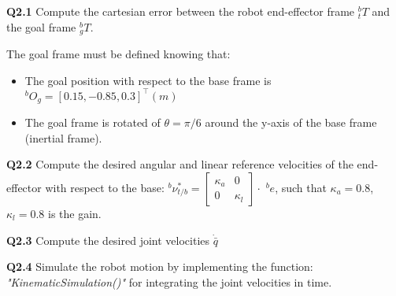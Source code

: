 \textbf{Q2.1} Compute the cartesian error between the robot end-effector frame $^b_t T$ and the goal frame $^b_{g} T$.

The goal frame  must be defined knowing that:
\begin{itemize}
    \item The goal position with respect to the base frame is $^b O_g = [0.15, -0.85, 0.3]^\top(m)$
    \item The goal frame is rotated of $\theta = \pi/6$ around the y-axis of the base frame (inertial frame).
\end{itemize}

\textbf{Q2.2}
Compute the desired angular and linear reference velocities of the end-effector  with respect to the base: $^b \nu^*_{t/b} = \begin{bmatrix}
    \kappa_a &0\\
    0 &\kappa_l
\end{bmatrix}\cdot$ ${}^be$, such that $\kappa_{a} = 0.8$,$\kappa_{l} = 0.8$ is the gain.
    
\textbf{Q2.3}
Compute the desired joint velocities $\dot{\bar{q}}$

\textbf{Q2.4}
Simulate the robot motion by implementing the function: \textit{"KinematicSimulation()"} for integrating the joint velocities in time.